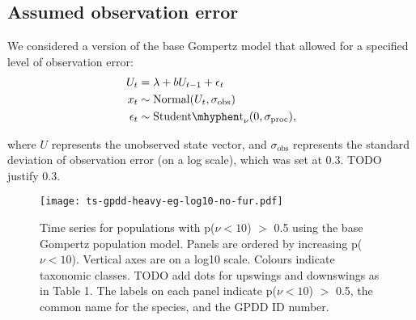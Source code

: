 \documentclass[11pt]{article}
\begin{document}
\subsection{Assumed observation error}

We considered a version of the base Gompertz model that allowed for a specified level of observation error:
\begin{align*}
U_t &= \lambda + b U_{t-1} + \epsilon_t\\
x_t &\sim \mathrm{Normal}(U_t, \sigma_\mathrm{obs})\\
\epsilon_t &\sim \mathrm{Student\mhyphen t}_\nu(0, \sigma_\mathrm{proc}),
\end{align*}

\noindent
where $U$ represents the unobserved state vector, and $\sigma_\mathrm{obs}$ represents the standard deviation of observation error (on a log scale), which was set at $0.3$. TODO justify $0.3$.


\renewcommand{\thetable}{S\arabic{table}}
\setcounter{table}{0}



\renewcommand{\thefigure}{S\arabic{figure}}
\setcounter{figure}{0}



\begin{figure}[htbp]
\begin{center}
\texttt{[image: ts-gpdd-heavy-eg-log10-no-fur.pdf]}
\caption{Time series for populations with p($\nu < 10$) $>$ 0.5 using the base Gompertz population model. Panels are ordered by increasing p($\nu < 10$). Vertical axes are on a log10 scale. Colours indicate taxonomic classes. TODO add dots for upswings and downswings as in Table 1. The labels on each panel indicate p($\nu < 10$) $>$ 0.5, the common name for the species, and the GPDD ID number.}
\label{fig:heavy-ts}
\end{center}
\end{figure}
\end{document}
